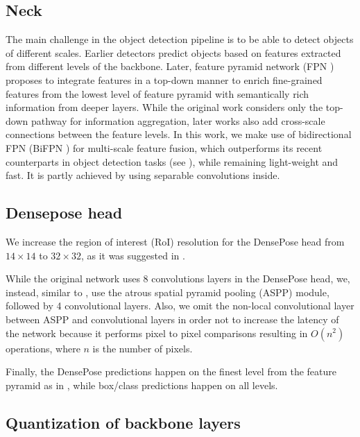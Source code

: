 \subsection{Neck}

The main challenge in the object detection pipeline is to be able to detect objects of different scales. Earlier detectors predict objects based on features extracted from different levels of the backbone. Later, feature pyramid network (FPN \cite{fpn}) proposes to integrate features in a top-down manner to enrich fine-grained features from the lowest level of feature pyramid with semantically rich information from deeper layers. While the original work \cite{fpn} considers only the top-down pathway for information aggregation, later works also add cross-scale connections between the feature levels. In this work, we make use of bidirectional FPN (BiFPN \cite{bifpn}) for multi-scale feature fusion, which outperforms its recent counterparts in object detection tasks (see \cite{bifpn}), while remaining light-weight and fast. It is partly achieved by using separable convolutions inside.

\subsection{Densepose head}

We increase the region of interest (RoI) resolution for the DensePose head from $14\times14$ to $32\times32$, as it was suggested in \cite{parsing}.

While the original network uses 8 convolutions layers in the DensePose head, we, instead, similar to \cite{parsing}, use the atrous spatial pyramid pooling (ASPP) \cite{aspp} module, followed by 4 convolutional layers. Also, we omit the non-local convolutional layer \cite{nonlocal} between ASPP and convolutional layers in order not to increase the latency of the network because it performs pixel to pixel comparisons resulting in $O(n^2)$ operations, where $n$ is the number of pixels.

Finally, the DensePose predictions happen on the finest level from the feature pyramid as in \cite{parsing}, while box/class predictions happen on all levels.

\subsection{Quantization of backbone layers}
\label{quant}

